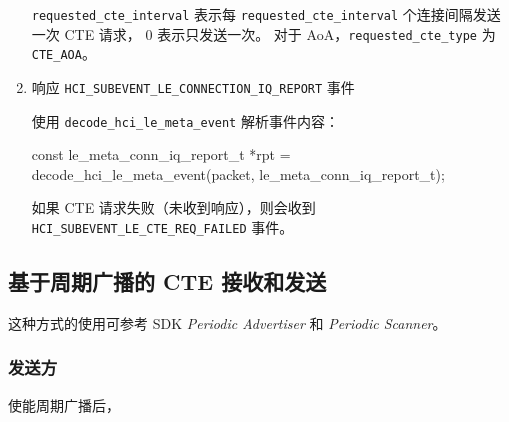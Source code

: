 \documentclass[
  12pt,
]{book}
\newenvironment{Shaded}{\begin{snugshade}}{\end{snugshade}}
\newcommand{\DataTypeTok}[1]{\textcolor[rgb]{0.13,0.29,0.53}{#1}}
\newcommand{\NormalTok}[1]{#1}
\begin{document}
\begin{enumerate}
  \texttt{requested\_cte\_interval} 表示每 \texttt{requested\_cte\_interval} 个连接间隔发送一次 CTE 请求， \(0\) 表示只发送一次。
  对于 AoA，\texttt{requested\_cte\_type} 为 \texttt{CTE\_AOA}。
\item
  响应 \texttt{HCI\_SUBEVENT\_LE\_CONNECTION\_IQ\_REPORT} 事件

  使用 \texttt{decode\_hci\_le\_meta\_event} 解析事件内容：

\begin{Shaded}
\begin{Highlighting}[]
\DataTypeTok{const}\NormalTok{ le_meta_conn_iq_report_t *rpt =}
\NormalTok{  decode_hci_le_meta_event(packet, le_meta_conn_iq_report_t);}
\end{Highlighting}
\end{Shaded}

  如果 CTE 请求失败（未收到响应），则会收到 \texttt{HCI\_SUBEVENT\_LE\_CTE\_REQ\_FAILED} 事件。
\end{enumerate}

\hypertarget{misc-cte-periodic-adv}{%
\subsection{基于周期广播的 CTE 接收和发送}\label{misc-cte-periodic-adv}}

这种方式的使用可参考 SDK \emph{Periodic Advertiser} 和 \emph{Periodic Scanner}。

\hypertarget{ux53d1ux9001ux65b9-1}{%
\subsubsection{发送方}\label{ux53d1ux9001ux65b9-1}}

使能周期广播后，
\end{document}
